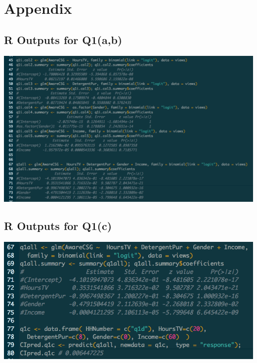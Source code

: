 \documentclass[10pt, oneside,spanish]{article}
\begin{document}
\pagebreak
\section{Appendix}



\subsection{R Outputs for Q1(a,b)}

\begin{center}
\includegraphics[width=16cm]{1a.png}
\end{center}

\subsection{R Outputs for Q1(c)}

\begin{center}
\includegraphics[width=14cm]{1all.png}
\end{center}


\end{document}
